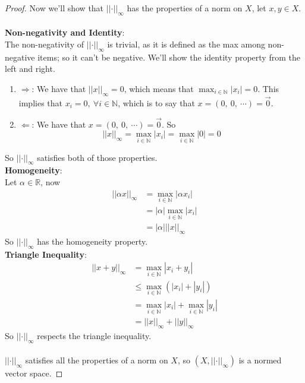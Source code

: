 \documentclass{article}
\newcommand{\be}{\begin{enumerate}}
\newcommand{\ee}{\end{enumerate}}
\newcommand{\norm}[1]{\left|\left|#1\right|\right|}
\newcommand{\abs}[1]{\left|#1\right|}
\newcommand{\parens}[1]{\left(#1\right)}
\newcommand{\R}{\mathbb{R}}
\newcommand{\N}{\mathbb{N}}
\begin{document}
\begin{proof}
    Now we'll show that $\norm{\cdot}_\infty$ has the properties of a 
    norm on $X$, let $x,y \in X$.\\\\
    \textbf{Non-negativity and Identity}:\\
    The non-negativity of $\norm{\cdot}_\infty$ is trivial, as it
    is defined as the max among non-negative items; so it can't be
    negative.
    We'll show the identity property from the left and right.
    \be
    \item[$\Longrightarrow$:] We have that $\norm{x}_\infty = 0$,
    which means that $\max_{i\in\N}\abs{x_i} = 0$. This implies that
    $x_i = 0,\ \forall i \in \N$, which is to say that $x = 
    \parens{0,\ 0,\ \cdots} = \vec{0}$.
    
    \item[$\Longleftarrow$:] We have that $x = \parens{0,\ 0,\
    \cdots} = \vec{0}$. So 
    $$\norm{x}_\infty = \max_{i\in\N}\abs{x_i} = \max_{i\in\N}\abs{0}
    = 0$$
    \ee
    So $\norm{\cdot}_\infty$ satisfies both of those properties.\\
    \textbf{Homogeneity}:\\
    Let $\alpha \in \R$, now
    \begin{align*}
    \norm{\alpha x}_\infty &= \max_{i\in\N}\abs{\alpha x_i} \\
    &= \abs{\alpha}\max_{i\in\N}\abs{x_i} \\
    &= \abs{\alpha}\norm{x}_\infty
    \end{align*}     
    So $\norm{\cdot}_\infty$ has the homogeneity property.\\
    \textbf{Triangle Inequality}:\\
    \begin{align*}
    \norm{x + y}_\infty &= \max_{i\in\N}\abs{x_i + y_i} \\
    &\leq  \max_{i\in\N}\parens{\abs{x_i} + \abs{y_i}} \\
    &= \max_{i\in\N}\abs{x_i} + \max_{i\in\N}\abs{y_i} \\
    &= \norm{x}_\infty + \norm{y}_\infty
    \end{align*}
    So $\norm{\cdot}_\infty$ respects the triangle inequality.\\\\
    $\norm{\cdot}_\infty$ satisfies all the properties of a norm on
    $X$, so $\parens{X,\norm{\cdot}_\infty}$ is a normed vector 
    space.
    \end{proof}
    
\end{document}
